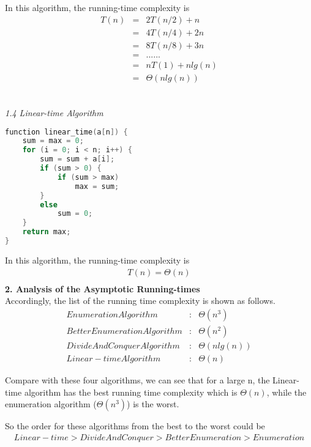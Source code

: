 \documentclass[11pt]{scrreprt}
\begin{document}
In this algorithm, the running-time complexity is
\begin{eqnarray*}
T(n) 	& = & 2T(n/2)+n\\
		& = & 4T(n/4)+2n\\
		& = & 8T(n/8)+3n\\
		& = & ......\\
		& = & nT(1)+nlg(n)\\
		& = & \Theta(nlg(n))\\\\\\\\\\\\
\end{eqnarray*}
\textit{1.4 Linear-time Algorithm}\\

\begin{lstlisting}[language=c]
function linear_time(a[n]) {
	sum = max = 0;
	for (i = 0; i < n; i++) {
		sum = sum + a[i];
		if (sum > 0) {
			if (sum > max)
				max = sum;
		}
		else
			sum = 0;
	}
	return max;
}
\end{lstlisting}

In this algorithm, the running-time complexity is
\begin{eqnarray*}
T(n) = \Theta(n)\\
\end{eqnarray*}
\textbf{2. Analysis of the Asymptotic Running-times}\\

Accordingly, the list of the running time complexity is shown as follows.
\begin{eqnarray*}
Enumeration Algorithm&:& \Theta(n^3)\\
Better Enumeration Algorithm&:& \Theta(n^2)\\
Divide And Conquer Algorithm&:& \Theta(nlg(n))\\
Linear-time Algorithm&:& \Theta(n)
\end{eqnarray*}

Compare with these four algorithms, we can see that for a large n, the Linear-time algorithm has the best running time complexity which is $\Theta(n)$, while the enumeration algorithm ($\Theta(n^3)$) is the worst.

So the order for these algorithms from the best to the worst could be 
\begin{eqnarray*}
Linear-time > Divide And Conquer > Better Enumeration > Enumeration
\end{eqnarray*}
\end{document}
